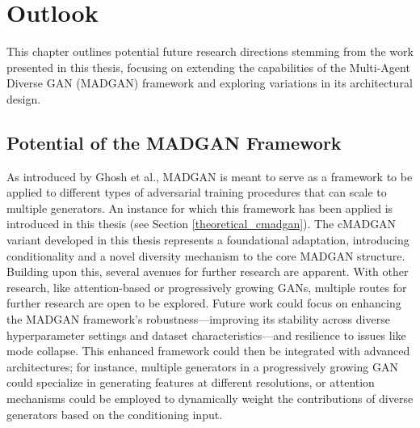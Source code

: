 \section{Outlook}\label{outlook}

This chapter outlines potential future research directions stemming from the work presented in this thesis, focusing on extending the capabilities of the Multi-Agent Diverse GAN (MADGAN) framework and exploring variations in its architectural design.
\subsection{Potential of the MADGAN Framework}
As introduced by Ghosh et al., MADGAN is meant to serve as a framework to be applied to different types of adversarial training procedures that can scale to multiple generators. An instance for which this framework has been applied is introduced in this thesis (see Section \ref{theoretical_cmadgan}). The cMADGAN variant developed in this thesis represents a foundational adaptation, introducing conditionality and a novel diversity mechanism to the core MADGAN structure. Building upon this, several avenues for further research are apparent. With other research, like attention-based or progressively growing GANs, multiple routes for further research are open to be explored. Future work could focus on enhancing the MADGAN framework's robustness—improving its stability across diverse hyperparameter settings and dataset characteristics—and resilience to issues like mode collapse. This enhanced framework could then be integrated with advanced architectures; for instance, multiple generators in a progressively growing GAN could specialize in generating features at different resolutions, or attention mechanisms could be employed to dynamically weight the contributions of diverse generators based on the conditioning input.

